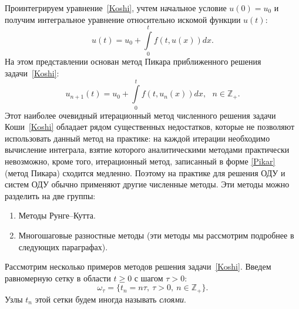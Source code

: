 \documentclass[11pt,a4paper,twoside]{report}
\numberwithin{equation}{section}
\theoremstyle{definition}
\theoremstyle{plain}
\begin{document}
Проинтегрируем уравнение~\eqref{Koshi},
учтем начальное условие $u(0) = u_0$ и получим интегральное уравнение относительно
искомой функции $u(t)$:
%
$$
    u(t) = u_0 + \int \limits_0^t f(t, u(x))dx.
$$
%
На этом представлении основан метод Пикара приближенного решения
задачи~\eqref{Koshi}:
%
\begin{equation}
%
    \label{Pikar}
    u_{n+1}(t) = u_0 + \int \limits_0^t f(t, u_n(x))dx, ~~~n \in \mathbb{Z}_+.
%
\end{equation}
%
Этот наиболее очевидный итерационный метод численного решения задачи Коши~\eqref{Koshi}
обладает рядом существенных недостатков, которые не позволяют использовать
данный метод на практике: на каждой итерации необходимо вычисление интеграла,
взятие которого аналитическими методами практически невозможно, кроме того,
итерационный метод, записанный в форме \eqref{Pikar} (метод Пикара) сходится медленно.
Поэтому на практике для решения ОДУ и систем ОДУ обычно применяют другие численные методы.
Эти методы можно разделить на две группы:
%
\begin{enumerate}
%
    \item
        Методы Рунге--Кутта.
    \item
        Многошаговые разностные методы (эти методы мы рассмотрим подробнее в следующих
        параграфах).
%
\end{enumerate}
%
Рассмотрим несколько примеров методов решения задачи~\eqref{Koshi}.
Введем равномерную сетку в области $t\geqslant 0$ с шагом $\tau > 0$:
%
$$
    \omega_\tau=\{t_n=n\tau,~\tau > 0,~n\in\mathbb{Z}_+\}.
$$
%
Узлы $t_n$ этой сетки будем иногда называть {\it слоями}.
\end{document}
